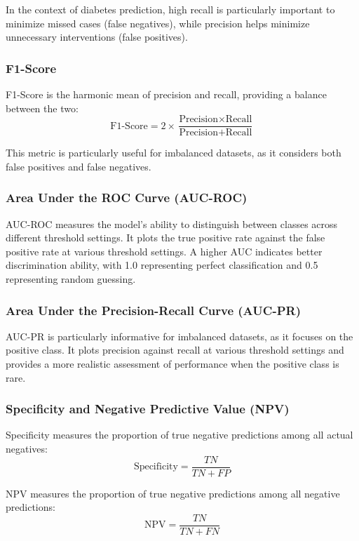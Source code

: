 \documentclass[journal]{IEEEtran}
\begin{document}
In the context of diabetes prediction, high recall is particularly important to minimize missed cases (false negatives), while precision helps minimize unnecessary interventions (false positives).

\subsubsection{F1-Score}
F1-Score is the harmonic mean of precision and recall, providing a balance between the two:
\begin{equation}
\text{F1-Score} = 2 \times \frac{\text{Precision} \times \text{Recall}}{\text{Precision} + \text{Recall}}
\end{equation}

This metric is particularly useful for imbalanced datasets, as it considers both false positives and false negatives.

\subsubsection{Area Under the ROC Curve (AUC-ROC)}
AUC-ROC measures the model's ability to distinguish between classes across different threshold settings. It plots the true positive rate against the false positive rate at various threshold settings. A higher AUC indicates better discrimination ability, with 1.0 representing perfect classification and 0.5 representing random guessing.

\subsubsection{Area Under the Precision-Recall Curve (AUC-PR)}
AUC-PR is particularly informative for imbalanced datasets, as it focuses on the positive class. It plots precision against recall at various threshold settings and provides a more realistic assessment of performance when the positive class is rare.

\subsubsection{Specificity and Negative Predictive Value (NPV)}
Specificity measures the proportion of true negative predictions among all actual negatives:
\begin{equation}
\text{Specificity} = \frac{TN}{TN + FP}
\end{equation}

NPV measures the proportion of true negative predictions among all negative predictions:
\begin{equation}
\text{NPV} = \frac{TN}{TN + FN}
\end{equation}
\end{document}
